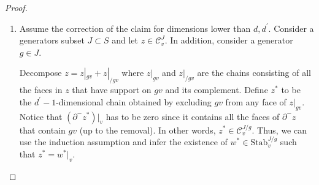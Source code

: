 \begin{proof}
\begin{enumerate}
    \item Assume the correction of the claim for dimensions lower than $d, d^{\prime}$. Consider a generators subset $J \subset S$ and let $z \in \mathcal{C}_{v}^{J}$. In addition, consider a generator $g \in J$.
      
      Decompose $z = z|_{gv} + z|_{/gv}$ where $z|_{gv}$ and $z|_{/gv}$ are the chains consisting of all the faces in $z$ that have support on $gv$ and its complement. Define $z^{*}$ to be the $d^{\prime}-1$-dimensional chain obtained by excluding $gv$ from any face of $z|_{gv}$. Notice that $(\partial^{-} z^{*})|_{v}$ has to be zero since it contains all the faces of $\partial^{-}z$ that contain $gv$ (up to the removal). In other words, $z^{*} \in \mathcal{C}_{v}^{J/g}$. Thus, we can use the induction assumption and infer the existence of $w^{*} \in \text{Stab}_{v}^{J/g}$ such that $z^{*} = w^{*}|_{v}$.


\end{enumerate}
\end{proof}
